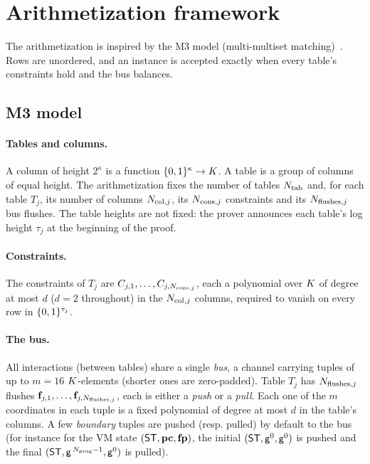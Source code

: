 \section{Arithmetization framework}\label{sec:arith}

The arithmetization is inspired by the M3 model (multi-multiset matching)~\cite{m3}. Rows are unordered, and an instance is accepted exactly when every table's constraints hold and the bus balances.

\subsection{M3 model}\label{sec:m3}

\paragraph{Tables and columns.} A column of height $2^{\kappa}$ is a function $\{0,1\}^{\kappa}\to K$. A table is a group of columns of equal height. The arithmetization fixes the number of tables $N_{\mathrm{tab}}$ and, for each table $T_j$, its number of columns $N_{\mathrm{col},j}$, its $N_{\mathrm{cons},j}$ constraints and its $N_{\mathrm{flushes},j}$ bus flushes. The table heights are not fixed: the prover announces each table's log height $\tau_j$ at the beginning of the proof.

\paragraph{Constraints.} The constraints of $T_j$ are $C_{j,1},\dots,C_{j,N_{\mathrm{cons},j}}$, each a polynomial over $K$ of degree at most $d$ ($d=2$ throughout) in the $N_{\mathrm{col},j}$ columns, required to vanish on every row in $\{0,1\}^{\tau_j}$.

\paragraph{The bus.} All interactions (between tables) share a single \emph{bus}, a channel carrying tuples of up to $m=16$ $K$-elements (shorter ones are zero-padded). Table $T_j$ has $N_{\mathrm{flushes},j}$ flushes $\mathbf{f}_{j,1},\dots,\mathbf{f}_{j,N_{\mathrm{flushes},j}}$, each is either a \emph{push} or a \emph{pull}. Each one of the $m$ coordinates in each tuple is a fixed polynomial of degree at most $d$ in the table's columns. A few \emph{boundary} tuples are pushed (resp. pulled) by default to the bus (for instance for the VM state $(\mathsf{ST}, \mathbf{pc}, \mathbf{fp})$, the initial $(\mathsf{ST}, \mathsf{g}^0, \mathsf{g}^0)$ is pushed and the final $(\mathsf{ST}, \mathsf{g}^{\,N_{\mathrm{prog}}-1}, \mathsf{g}^{0})$ is pulled).


